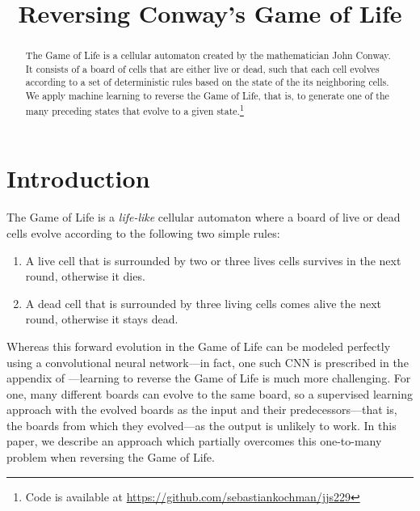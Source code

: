 \documentclass[conference]{IEEEtran}
\begin{document}
\title{Reversing Conway's Game of Life}

\author{
\and
{}
\and
{}
}

\maketitle

\begin{abstract}
The Game of Life \cite{wiki:GameOfLife} is a cellular automaton created by the mathematician John Conway. It consists of a board of cells that are either live or dead, such that each cell evolves according to a set of deterministic rules  based on the state of the its neighboring cells. We apply machine learning to reverse the Game of Life, that is, to generate one of the many preceding states that evolve to a given state.\footnote{Code is available at \url{https://github.com/sebastiankochman/jjs229}}
\end{abstract}

\section{Introduction}
\label{intro}
The Game of Life is a \emph{life-like} cellular automaton \cite{wiki:LifeLikeAutomaton} where a board of live or dead cells evolve according to the following two simple rules:
\begin{enumerate}
    \item A live cell that is surrounded by two or three lives cells survives in the next round, otherwise it dies.
    \item A dead cell that is surrounded by three living cells comes alive the next round, otherwise it stays dead.
\end{enumerate}
Whereas this forward evolution in the Game of Life can be modeled perfectly using a convolutional neural network---in fact, one such CNN is prescribed in the appendix of  \cite{springer2020its}---learning to reverse the Game of Life is much more challenging. For one, many different boards can evolve to the same board, so a supervised learning approach with the evolved boards as the input and their predecessors---that is, the boards from which they evolved---as the output is unlikely to work. In this paper, we describe an approach which partially overcomes this one-to-many problem when reversing the Game of Life.
\end{document}
